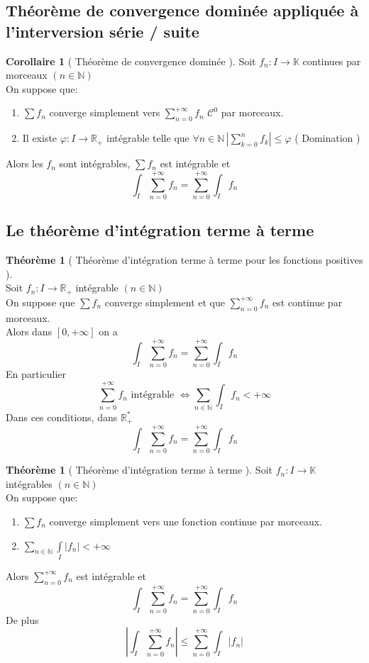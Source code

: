 \documentclass[10pt,a4paper]{article}
\theoremstyle{definition}
\newtheorem{theorem}[proposition]{Théorème}
\newtheorem{corollary}[proposition]{Corollaire}
\begin{document}
\subsection{Théorème de convergence dominée appliquée à l'interversion série / suite}
\begin{corollary}[ Théorème de convergence dominée ]
    Soit \(f_n: I \to \mathbb{K}\) continues par morceaux \((n \in \mathbb{N})\) \\
    On suppose que:
    \begin{enumerate}
        \item \(\sum f_n\) converge simplement vers \(\sum\limits_{n = 0}^{+\infty} f_n\) \(\mathcal{C}^0\) par morceaux.
        \item Il existe \(\varphi: I \to \mathbb{R}_+\) intégrable telle que \(\forall n \in \mathbb{N}\, \left| \sum\limits_{k = 0}^{n} f_k \right| \leq \varphi\) ( Domination )
    \end{enumerate}
    Alors les \(f_n\) sont intégrables, \(\sum f_n\) est intégrable et
    \[\boxed{\int_{I} \sum_{n = 0}^{+\infty} f_n = \sum_{n = 0}^{+\infty}\int_{I} f_n}\]
\end{corollary}

\subsection{Le théorème d'intégration terme à terme}
\begin{theorem}[ Théorème d'intégration terme à terme pour les fonctions positives ]
    \hfill \\
    Soit \(f_n: I \to \mathbb{R}_+\) intégrable \((n \in \mathbb{N})\) \\
    On suppose que \(\sum f_n\) converge simplement et que \(\sum\limits_{n = 0}^{+\infty} f_n\) est continue par morceaux. \\
    Alors dans \([0, +\infty]\) on a
    \[\int_{I}\sum_{n = 0}^{+\infty}f_n = \sum_{n = 0}^{+\infty} \int_{I} f_n\]
    En particulier
    \[\sum_{n = 0}^{+\infty} f_n \text{ intégrable } \iff \sum_{n \in \mathbb{N}} \int_{I} f_n < +\infty\]
    Dans ces conditions, dans \(\mathbb{R}_+^*\)
    \[\int_{I}\sum_{n = 0}^{+\infty}f_n = \sum_{n = 0}^{+\infty} \int_{I} f_n\]
\end{theorem}
\begin{theorem}[ Théorème d'intégration terme à terme ]
    Soit \(f_n: I \to \mathbb{K}\) intégrables \((n \in \mathbb{N})\) \\
    On suppose que:
    \begin{enumerate}
        \item \(\sum f_n\) converge simplement vers une fonction continue par morceaux.
        \item \(\sum\limits_{n \in \mathbb{N}}\int\limits_{I}|f_n| < +\infty\)
    \end{enumerate}
    Alors \(\sum\limits_{n = 0}^{+\infty} f_n\) est intégrable et
    \[\boxed{\int_{I}\sum_{n = 0}^{+\infty}f_n = \sum_{n = 0}^{+\infty}\int_{I} f_n}\]
    De plus
    \[\left| \int_{I}\sum_{n = 0}^{+\infty}f_n \right| \leq \sum_{n = 0}^{+\infty} \int_{I}|f_n|\]
\end{theorem}
\end{document}
